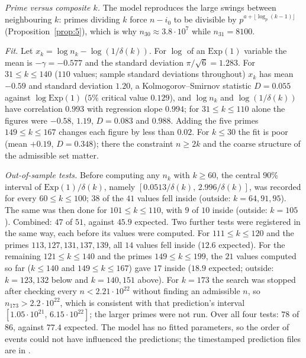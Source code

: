 \documentclass[11pt]{amsart}
\theoremstyle{remark}
\newcommand{\Exp}{\mathrm{Exp}}
\begin{document}
\emph{Prime versus composite $k$.} The model reproduces the large swings between neighbouring $k$: primes dividing $k$ force $n-i_0$ to be divisible by $p^{a+\lfloor\log_p(k-1)\rfloor}$ (Proposition~\ref{prop:5}), which is why $n_{30}\approx3.8\cdot10^7$ while $n_{31}=8100$.

\emph{Fit.} Let $x_k=\log n_k-\log(1/\delta(k))$. For $\log$ of an $\Exp(1)$ variable the mean is $-\gamma=-0.577$ and the standard deviation $\pi/\sqrt6=1.283$. For $31\le k\le140$ ($110$ values; sample standard deviations throughout) $x_k$ has mean $-0.59$ and standard deviation $1.20$, a Kolmogorov--Smirnov statistic $D=0.055$ against $\log\Exp(1)$ ($5\%$ critical value $0.129$), and $\log n_k$ and $\log(1/\delta(k))$ have correlation $0.993$ with regression slope $0.994$; for $31\le k\le110$ alone the figures were $-0.58$, $1.19$, $D=0.083$ and $0.988$. Adding the five primes $149\le k\le167$ changes each figure by less than $0.02$. For $k\le30$ the fit is poor (mean $+0.19$, $D=0.348$); there the constraint $n\ge2k$ and the coarse structure of the admissible set matter.

\emph{Out-of-sample tests.} Before computing any $n_k$ with $k\ge60$, the central $90\%$ interval of $\Exp(1)/\delta(k)$, namely $[0.0513/\delta(k),\,2.996/\delta(k)]$, was recorded for every $60\le k\le100$; $38$ of the $41$ values fell inside (outside: $k=64,91,95$). The same was then done for $101\le k\le110$, with $9$ of $10$ inside (outside: $k=105$). Combined: $47$ of $51$, against $45.9$ expected. Two further tests were registered in the same way, each before its values were computed. For $111\le k\le120$ and the primes $113,127,131,137,139$, all $14$ values fell inside ($12.6$ expected). For the remaining $121\le k\le140$ and the primes $149\le k\le199$, the $21$ values computed so far ($k\le140$ and $149\le k\le167$) gave $17$ inside ($18.9$ expected; outside: $k=123,132$ below and $k=140,151$ above). For $k=173$ the search was stopped after checking every $n<2.21\cdot10^{22}$ without finding an admissible $n$, so $n_{173}>2.2\cdot10^{22}$, which is consistent with that prediction's interval $[1.05\cdot10^{21},\,6.15\cdot10^{22}]$; the larger primes were not run. Over all four tests: $78$ of $86$, against $77.4$ expected. The model has no fitted parameters, so the order of events could not have influenced the predictions; the timestamped prediction files are in \cite{code}.
\end{document}
